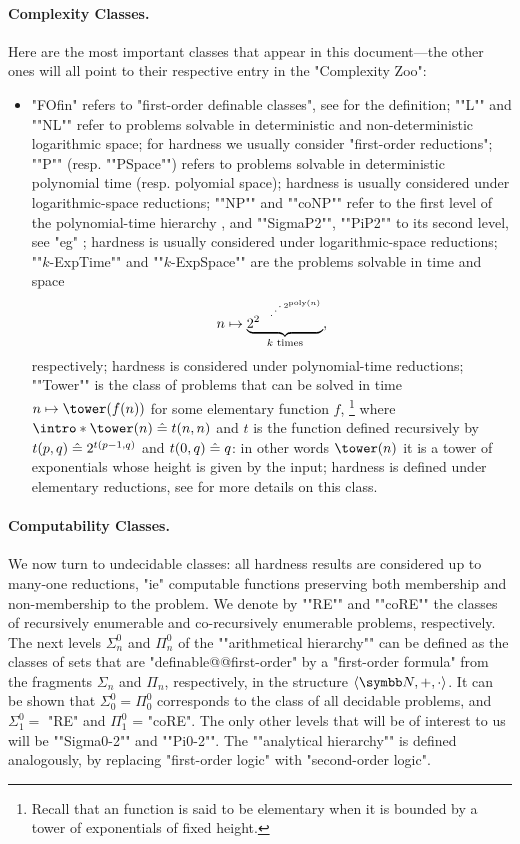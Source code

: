 \paragraph*{Complexity Classes.}
Here are the most important classes that appear in this document---the other ones
will all point to their respective entry in the "Complexity Zoo":
\begin{itemize}
	\item "FOfin" refers to "first-order definable classes", see  for the definition;
	\itemAP ""L"" and ""NL"" refer to problems solvable in deterministic and non-deterministic logarithmic 
	space; for hardness we usually consider "first-order reductions";
	\itemAP ""P"" (resp. ""PSpace"") refers to problems solvable in deterministic polynomial time
	(resp. polyomial space); hardness is usually considered under logarithmic-space reductions;
	\itemAP ""NP"" and ""coNP"" refer to the first level of the polynomial-time hierarchy
		\cite[\S~2]{AroraBarak2009ComputationalComplexity},
		and ""SigmaP2"", ""PiP2"" to its second level,
		see "eg" \cite[\S~5]{AroraBarak2009ComputationalComplexity};
		hardness is usually considered under logarithmic-space reductions;
	\itemAP ""$k$-ExpTime"" and ""$k$-ExpSpace"" are the
		problems solvable in time and space
		\[n \mapsto \underbrace{2^{2^{{\,\rotatebox{90}{\tiny$\ddots$}\,}^{2^{\poly(n)}}}}}_{k \text{ times}},\]
		respectively; hardness is considered under polynomial-time reductions;
	\itemAP ""Tower"" is the class of problems that can be solved in time
		$n\mapsto \tower(f(n))$ for some elementary function $f$,%
		\footnote{Recall that an function is said to be elementary when it
		is bounded by a tower of exponentials of fixed height.}
		where $\intro*\tower(n) \defeq t(n,n)$ and $t$ is the function
		defined recursively by $t(p,q) \mathrel{\hat{=}} 2^{t(p-1,q)}$ and $t(0,q) \mathrel{\hat{=}} q$:
		in other words $\tower(n)$ it is a tower of exponentials whose height is given by the input;
		hardness is defined under elementary reductions,
		see \cite{Schmitz2016ComplexityHierarchies} for more details on this class.
\end{itemize}

\paragraph*{Computability Classes.}
We now turn to undecidable classes: all hardness results are considered up to
many-one reductions, "ie" computable functions preserving both membership and non-membership
to the problem.
We denote by \AP""RE"" and ""coRE"" the classes of recursively enumerable
and co-recursively enumerable problems, respectively. 
The next levels $\Sigma^0_n$ and $\Pi^0_n$ of the \AP""arithmetical hierarchy"" can be defined 
as the classes of sets that are "definable@@first-order" by a "first-order formula"
from the fragments $\Sigma_n$ and $\Pi_n$, respectively, in the structure $\tup{\N,+,\cdot}$.
It can be shown that $\Sigma^0_0 = \Pi^0_0$ corresponds to the class of all decidable problems,
and $\Sigma^0_1 =$ "RE" and $\Pi^0_1$ = "coRE". The only other levels that will be of interest
to us will be \AP""Sigma0-2"" and ""Pi0-2"".
The ""analytical hierarchy"" is defined analogously, by replacing "first-order logic" with
"second-order logic".


